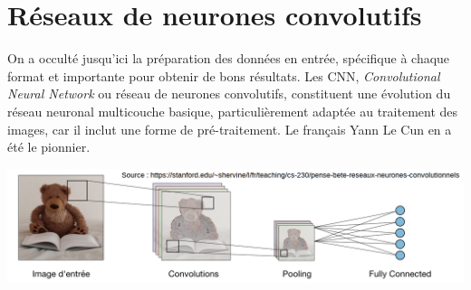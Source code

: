 \documentclass[a4paper,11pt]{article} %
\begin{document}
\section{Réseaux de neurones convolutifs}
On a occulté jusqu'ici la préparation des données en entrée, spécifique à chaque format et importante pour obtenir de bons résultats. Les CNN, \emph{Convolutional Neural Network} ou réseau de neurones convolutifs, constituent une évolution du réseau neuronal multicouche basique, particulièrement adaptée au traitement des images, car il inclut une forme de pré-traitement. Le français Yann Le Cun en a été le pionnier.\\
\begin{center}
	\includegraphics[width=\linewidth]{architecture-cnn.png}
\end{center}
\end{document}
